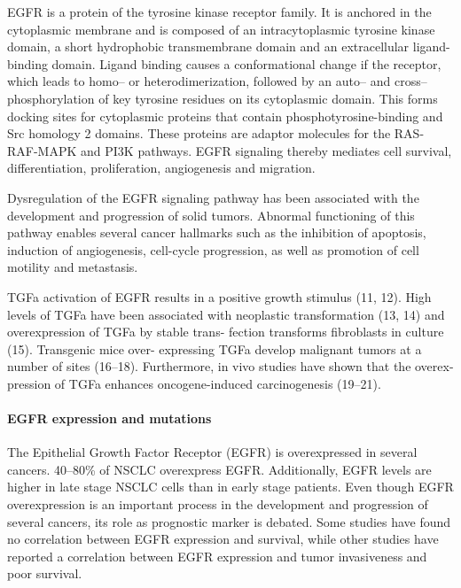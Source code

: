       EGFR is a protein of the tyrosine kinase receptor family. It is anchored in
      the cytoplasmic membrane and is composed of an intracytoplasmic tyrosine
      kinase domain, a short hydrophobic transmembrane domain and an extracellular
      ligand-binding domain. Ligand binding causes a conformational change if the
      receptor, which leads to homo-- or heterodimerization, followed by an auto--
      and cross--phosphorylation of key tyrosine residues on its cytoplasmic
      domain. This forms docking sites for cytoplasmic proteins that contain
      phosphotyrosine-binding and Src homology 2 domains. These proteins are
      adaptor molecules for the RAS-RAF-MAPK and PI3K pathways. EGFR signaling
      thereby mediates cell survival, differentiation, proliferation, angiogenesis
      and migration.

      Dysregulation of the EGFR signaling pathway has been associated with the
      development and progression of solid tumors. Abnormal functioning of this
      pathway enables several cancer hallmarks such as the inhibition of
      apoptosis, induction of angiogenesis, cell-cycle progression, as well as
      promotion of cell motility and metastasis.

      TGFa activation of EGFR results in a positive growth stimulus (11, 12).
      High levels of TGFa have been associated with neoplastic transformation
      (13, 14) and overexpression of TGFa by stable trans- fection transforms
      fibroblasts in culture (15). Transgenic mice over- expressing TGFa develop
      malignant tumors at a number of sites (16–18). Furthermore, in vivo
      studies have shown that the overex- pression of TGFa enhances
      oncogene-induced carcinogenesis (19–21).

      \paragraph{EGFR expression and mutations}

      The Epithelial Growth Factor Receptor (EGFR) is overexpressed in several
      cancers. 40--80\% of NSCLC overexpress EGFR. Additionally, EGFR levels are
      higher in late stage NSCLC cells than in early stage patients. Even though
      EGFR overexpression is an important process in the development and
      progression of several cancers, its role as prognostic marker is debated.
      Some studies have found no correlation between EGFR expression and
      survival, while other studies have reported a correlation between EGFR
      expression and tumor invasiveness and poor survival.

